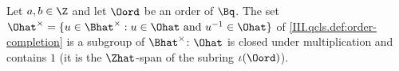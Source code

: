 Let $a,b\in\Z$ and let $\Oord$ be an order of $\Bq$. The set $\Ohat^\times=\{u\in\Bhat^\times:u\in\Ohat\text{ and }u^{-1}\in\Ohat\}$ of
\cref{III.qcls.def:order-completion} is a subgroup of $\Bhat^\times$: $\Ohat$ is closed under multiplication and contains $1$ (it is the $\Zhat$-span of the subring $\iota(\Oord)$).
